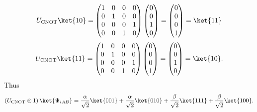 \documentclass[11pt, letterpaper]{article}
\begin{document}
\[
	U_{\mathrm{CNOT} } \ket{10}=\begin{pmatrix}
	1 & 0 & 0 & 0 \\
	0 & 1 & 0 & 0 \\
	0 & 0 & 0 & 1 \\
	0 & 0 & 1 & 0
	\end{pmatrix}\begin{pmatrix}
	0 \\
	0 \\
	1 \\
	0
	\end{pmatrix}=\begin{pmatrix}
	0 \\
	0 \\
	0 \\
	1
\end{pmatrix}=\ket{11}
\]
\[
	U_{\mathrm{CNOT} } \ket{11}=\begin{pmatrix}
	1 & 0 & 0 & 0 \\
	0 & 1 & 0 & 0 \\
	0 & 0 & 0 & 1 \\
	0 & 0 & 1 & 0
	\end{pmatrix}\begin{pmatrix}
	0 \\
	0 \\
	0 \\
	1
	\end{pmatrix}=\begin{pmatrix}
	0 \\
	0 \\
	1 \\
	0
\end{pmatrix}=\ket{10}.
\]
Thus
\[
	\left( U_{\mathrm{CNOT} } \otimes 1 \right) \ket{\Psi _{iAB} }=\frac{\alpha }{\sqrt{2} } \ket{001}+\frac{\alpha }{\sqrt{2} } \ket{010}+\frac{\beta }{\sqrt{2} } \ket{111}+\frac{\beta }{\sqrt{2} } \ket{100}
.\]
\end{document}
